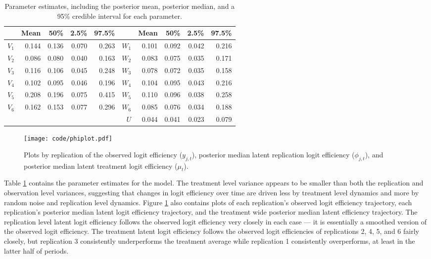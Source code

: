\documentclass[graybox]{svmult}
\begin{document}
\begin{table}[ht]
\centering
\begin{tabular}{rrrrr|rrrrr}
  \hline
 & Mean & 50\% & 2.5\% & 97.5\% && Mean & 50\% & 2.5\% & 97.5\% \\  
  \hline
  $V_1$ & 0.144 & 0.136 & 0.070 & 0.263 & $W_1$ & 0.101 & 0.092 & 0.042 & 0.216 \\ 
  $V_2$ & 0.086 & 0.080 & 0.040 & 0.163 & $W_2$ & 0.083 & 0.075 & 0.035 & 0.171 \\ 
  $V_3$ & 0.116 & 0.106 & 0.045 & 0.248 & $W_3$ & 0.078 & 0.072 & 0.035 & 0.158 \\ 
  $V_4$ & 0.102 & 0.095 & 0.046 & 0.196 & $W_4$ & 0.104 & 0.095 & 0.043 & 0.216 \\  
  $V_5$ & 0.208 & 0.196 & 0.075 & 0.415 & $W_5$ & 0.110 & 0.096 & 0.038 & 0.258 \\ 
  $V_6$ & 0.162 & 0.153 & 0.077 & 0.296 & $W_6$ & 0.085 & 0.076 & 0.034 & 0.188 \\ 
  &&&&& $U$ & 0.044 & 0.041 & 0.023 & 0.079 \\  
   \hline
\end{tabular}
\caption{Parameter estimates, including the posterior mean, posterior median, and a 95\% credible interval for each parameter.}
\label{tab:parests}
\end{table}

\begin{figure}[h]
\centering
\texttt{[image: code/phiplot.pdf]}
\caption{Plots by replication of the observed logit efficiency ($y_{j,t}$), posterior median latent replication logit efficiency ($\phi_{j,t}$), and posterior median latent treatment logit efficiency ($\mu_t$).}
\label{fig:phiplot}
\end{figure}

Table \ref{tab:parests} contains the parameter estimates for the model. The treatment level variance appears to be smaller than both the replication and observation level variances, suggesting that changes in logit efficiency over time are driven less by treatment level dynamics and more by random noise and replication level dynamics. Figure \ref{fig:phiplot} also contains plots of each replication's observed logit efficiency trajectory, each replication's posterior median latent logit efficiency trajectory, and the treatment wide posterior median latent efficiency trajectory. The replication level latent logit efficiency follows the observed logit efficiency very closely in each case --- it is essentially a smoothed version of the observed logit efficiency. The treatment latent logit efficiency follows the observed logit efficiencies of replications 2, 4, 5, and 6 fairly closely, but replication 3 consistently underperforms the treatment average while replication 1 consistently overperforms, at least in the latter half of periods.
\end{document}
